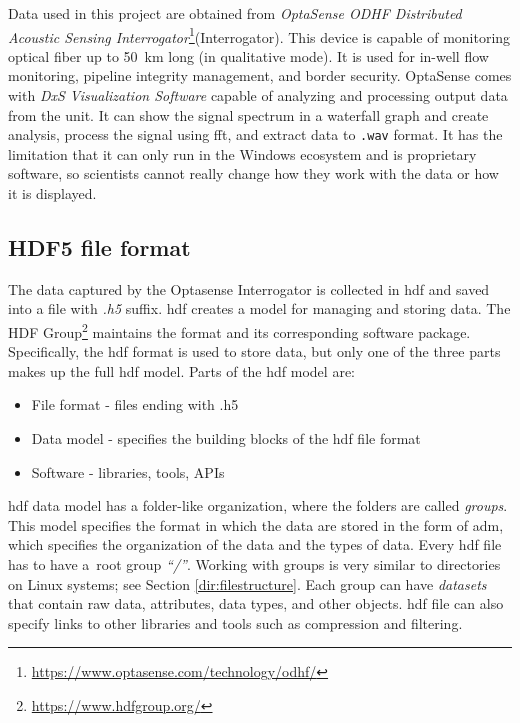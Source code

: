 Data used in this project are obtained from \textit{OptaSense ODHF Distributed Acoustic Sensing Interrogator}\footnote{\url{https://www.optasense.com/technology/odhf/}}(Interrogator). This device is capable of monitoring optical fiber up to \qty{50}{\km} long (in qualitative mode). It is used for in-well flow monitoring, pipeline integrity management, and border security. OptaSense comes with \textit{DxS Visualization Software} capable of analyzing and processing output data from the unit. It can show the signal spectrum in a waterfall graph and create analysis, process the signal using \ac{fft}, and extract data to \verb|.wav| format. It has the limitation that it can only run in the Windows ecosystem and is proprietary software, so scientists cannot really change how they work with the data or how it is displayed.


\subsection{HDF5 file format}\label{txt.hdf5}

The data captured by the Optasense Interrogator is collected in \ac{hdf} and saved into a file with \textit{.h5} suffix. \ac{hdf} creates a model for managing and storing data. The HDF Group\footnote{\url{https://www.hdfgroup.org/}} maintains the format and its corresponding software package. Specifically, the \ac{hdf} format is used to store data, but only one of the three parts makes up the full \ac{hdf} model. Parts of the \ac{hdf} model are:

\begin{itemize}
    \item File format - files ending with .h5
    \item Data model - specifies the building blocks of the \ac{hdf} file format
    \item Software - libraries, tools, APIs
\end{itemize}

\bigskip

\ac{hdf} data model has a folder-like organization, where the folders are called \textit{groups}. This model specifies the format in which the data are stored in the form of \ac{adm}, which specifies the organization of the data and the types of data. Every \ac{hdf} file has to have a~root group \textit{``/''}. Working with groups is very similar to directories on Linux systems; see Section \ref{dir:filestructure}. Each group can have \textit{datasets} that contain raw data, attributes, data types, and other objects. \ac{hdf} file can also specify links to other libraries and tools such as compression and filtering.

